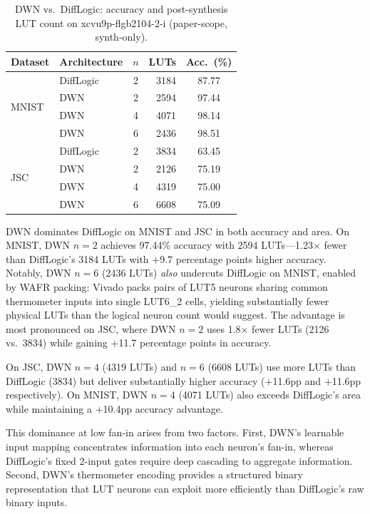 \documentclass[conference]{IEEEtran}
\begin{document}
\begin{table}[t]
\centering
\caption{DWN vs.\ DiffLogic: accuracy and post-synthesis LUT count on xcvu9p-flgb2104-2-i (paper-scope, synth-only).}
\label{tab:pareto}
\begin{tabular}{@{}llcrc@{}}
\toprule
\textbf{Dataset} & \textbf{Architecture} & \textbf{$n$} & \textbf{LUTs} & \textbf{Acc.\ (\%)} \\
\midrule
\multirow{4}{*}{MNIST}
  & DiffLogic        & 2 & \num{3184}  & 87.77 \\
  & DWN              & 2 & \num{2594}  & 97.44 \\
  & DWN              & 4 & \num{4071}  & 98.14 \\
  & DWN              & 6 & \num{2436}  & 98.51 \\
\midrule
\multirow{4}{*}{JSC}
  & DiffLogic        & 2 & \num{3834}  & 63.45 \\
  & DWN              & 2 & \num{2126}  & 75.19 \\
  & DWN              & 4 & \num{4319}  & 75.00 \\
  & DWN              & 6 & \num{6608}  & 75.09 \\
\bottomrule
\end{tabular}
\end{table}

DWN dominates DiffLogic on MNIST and JSC in both accuracy and area.
On MNIST, DWN $n{=}2$ achieves 97.44\% accuracy with \num{2594} LUTs---1.23$\times$ fewer than DiffLogic's \num{3184} LUTs with $+$9.7 percentage points higher accuracy.
Notably, DWN $n{=}6$ (\num{2436} LUTs) \emph{also} undercuts DiffLogic on MNIST, enabled by WAFR packing: Vivado packs pairs of LUT5 neurons sharing common thermometer inputs into single LUT6\_2 cells, yielding substantially fewer physical LUTs than the logical neuron count would suggest.
The advantage is most pronounced on JSC, where DWN $n{=}2$ uses 1.8$\times$ fewer LUTs (\num{2126} vs.\ \num{3834}) while gaining $+$11.7 percentage points in accuracy.

On JSC, DWN $n{=}4$ (\num{4319} LUTs) and $n{=}6$ (\num{6608} LUTs) use more LUTs than DiffLogic (\num{3834}) but deliver substantially higher accuracy ($+$11.6pp and $+$11.6pp respectively).
On MNIST, DWN $n{=}4$ (\num{4071} LUTs) also exceeds DiffLogic's area while maintaining a $+$10.4pp accuracy advantage.

This dominance at low fan-in arises from two factors.
First, DWN's learnable input mapping concentrates information into each neuron's fan-in, whereas DiffLogic's fixed 2-input gates require deep cascading to aggregate information.
Second, DWN's thermometer encoding provides a structured binary representation that LUT neurons can exploit more efficiently than DiffLogic's raw binary inputs.
\end{document}
